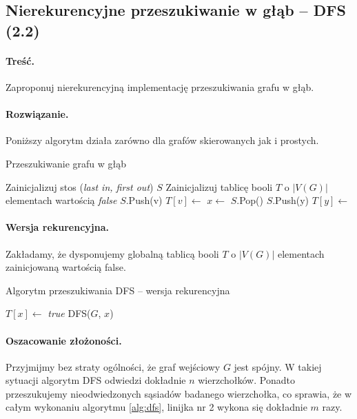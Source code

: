 \subsection{Nierekurencyjne przeszukiwanie w głąb -- DFS (2.2)}
\label{zad:dfsnr}
\paragraph{Treść.} Zaproponuj nierekurencyjną implementację
przeszukiwania grafu w głąb.
\paragraph{Rozwiązanie.}
Poniższy algorytm działa zarówno dla grafów skierowanych
jak i prostych.

\begin{algorithm}[H]
	\caption{Przeszukiwanie grafu w głąb}\label{Zadanie22a}
	\begin{algorithmic}[1]
		\State Zainicjalizuj stos (\textit{last in, first out}) $S$
		\State Zainicjalizuj tablicę booli $T$ o $|V(G)|$ elementach wartością 
		\textit{false}
		\State $S$.Push(v)
		\State $T[v] \gets$ \false
		\State $x \gets$ $S$.Pop()
		\State $S$.Push(y)
		\State $T[y] \gets$ \true 
		\EndIf
		\EndWhile
		\EndWhile
		\EndProcedure
	\end{algorithmic}
\end{algorithm}

\paragraph{Wersja rekurencyjna.} Zakładamy, że dysponujemy globalną
tablicą booli $T$ o $|V(G)|$ elementach zainicjowaną wartością 
\textsf{false}.

\begin{algorithm}[H]
	\caption{Algorytm przeszukiwania DFS -- wersja rekurencyjna}\label{Zadanie22b}
	\begin{algorithmic}[1]
		\State $T[x] \gets$ \textit{true}
		\State \textsc{DFS}($G$, $x$)
		\EndIf
		\EndWhile
		\EndProcedure
	\end{algorithmic}
	\label{alg:dfs}
\end{algorithm}

\paragraph{Oszacowanie złożoności.} Przyjmijmy bez straty ogólności, że graf wejściowy
$G$ jest spójny. W takiej sytuacji algorytm DFS odwiedzi dokładnie $n$ wierzchołków. Ponadto
przeszukujemy nieodwiedzonych sąsiadów badanego wierzchołka, co sprawia, że w całym
wykonaniu algorytmu \ref{alg:dfs}, linijka nr 2 wykona się dokładnie $m$ razy.

